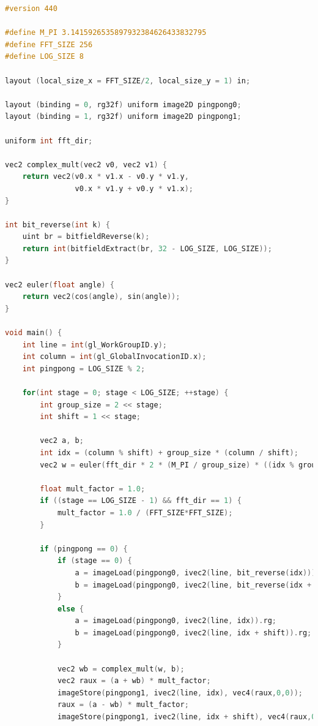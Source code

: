 \documentclass[
  oneside,
  11pt, a4paper,
  footinclude=true,
  headinclude=true,
  cleardoublepage=empty
]{scrbook}
\begin{document}
\begin{lstlisting}[language=C,caption={FFT Radix-2 Cooley-Tukey Vertical unique pass, see \autoref{subsec:all-stages-in-one-pass}},label={lst:glsl-radix2-ct-unique-vertical}]
#version 440

#define M_PI 3.1415926535897932384626433832795
#define FFT_SIZE 256
#define LOG_SIZE 8

layout (local_size_x = FFT_SIZE/2, local_size_y = 1) in;

layout (binding = 0, rg32f) uniform image2D pingpong0;
layout (binding = 1, rg32f) uniform image2D pingpong1;

uniform int fft_dir;

vec2 complex_mult(vec2 v0, vec2 v1) {
	return vec2(v0.x * v1.x - v0.y * v1.y,
				v0.x * v1.y + v0.y * v1.x);
}

int bit_reverse(int k) {
    uint br = bitfieldReverse(k);
    return int(bitfieldExtract(br, 32 - LOG_SIZE, LOG_SIZE));
}

vec2 euler(float angle) {
	return vec2(cos(angle), sin(angle));
}

void main() {
	int line = int(gl_WorkGroupID.y);
	int column = int(gl_GlobalInvocationID.x);
    int pingpong = LOG_SIZE % 2;

    for(int stage = 0; stage < LOG_SIZE; ++stage) {
        int group_size = 2 << stage;
        int shift = 1 << stage;
        
        vec2 a, b;
        int idx = (column % shift) + group_size * (column / shift);
        vec2 w = euler(fft_dir * 2 * (M_PI / group_size) * ((idx % group_size) % shift));

        float mult_factor = 1.0;
        if ((stage == LOG_SIZE - 1) && fft_dir == 1) {
            mult_factor = 1.0 / (FFT_SIZE*FFT_SIZE);
        }

        if (pingpong == 0) {
            if (stage == 0) {
                a = imageLoad(pingpong0, ivec2(line, bit_reverse(idx))).rg;
                b = imageLoad(pingpong0, ivec2(line, bit_reverse(idx + shift))).rg;
            }
            else {
                a = imageLoad(pingpong0, ivec2(line, idx)).rg;
                b = imageLoad(pingpong0, ivec2(line, idx + shift)).rg;
            }

            vec2 wb = complex_mult(w, b);
            vec2 raux = (a + wb) * mult_factor;
            imageStore(pingpong1, ivec2(line, idx), vec4(raux,0,0));
            raux = (a - wb) * mult_factor;
            imageStore(pingpong1, ivec2(line, idx + shift), vec4(raux,0,0));


\end{lstlisting}
\end{document}
